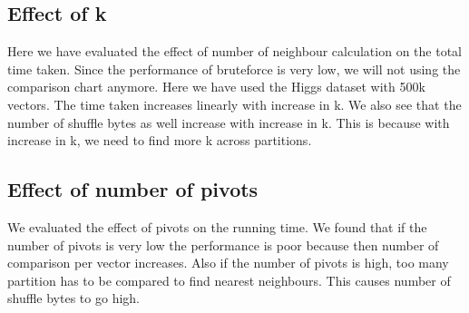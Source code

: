 \documentclass[12pt]{article}
\begin{document}
\bigskip


\subsection{Effect of k}

Here we have evaluated the effect of number of neighbour calculation
on the total time taken. Since the performance of bruteforce is very low, we will not using the
comparison chart anymore. Here we have used the Higgs dataset with
500k vectors. The time taken increases linearly with increase in k. We
also see that the number of shuffle bytes as well increase with
increase in k. This is because with increase in k, we need to find
more k across partitions.

\medskip



\subsection{Effect of number of pivots}
We evaluated the effect of pivots on the running time.
We found that if the number of pivots is very low the
performance is poor because then number of comparison per vector
increases. Also if the number of pivots is high, too many partition
has to be compared to find nearest neighbours. This causes number of
shuffle bytes to go high.
\end{document}
